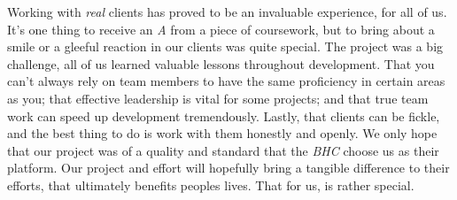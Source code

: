 \documentclass{l3proj}
\begin{document}
Working with \textit{real} clients has proved to be an invaluable experience, for all of us. It's one thing to receive an \textit{A} from a piece of coursework, but to bring about a smile or a gleeful reaction in our clients was quite special. The project was a big challenge, all of us learned valuable lessons throughout development. That you can't always rely on team members to have the same proficiency in certain areas as you; that effective leadership is vital for some projects; and that true team work can speed up development tremendously. Lastly, that clients can be fickle, and the best thing to do is work with them honestly and openly. We only hope that our project was of a quality and standard that the \textit{BHC} choose us as their platform. Our project and effort will hopefully bring a tangible difference to their efforts, that ultimately benefits peoples lives. That for us, is rather special.


\newpage
\printbibliography[title={Bibliography}]
\end{document}
